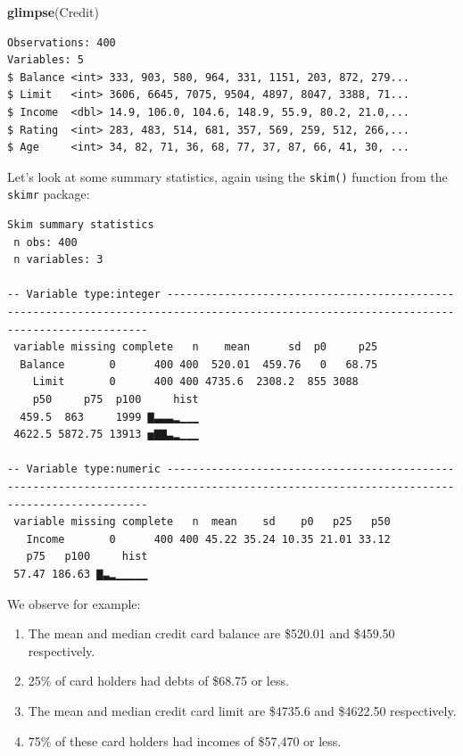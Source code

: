 \documentclass[12pt,]{krantz}
\makeatletter
\newenvironment{Shaded}{\begin{snugshade}}{\end{snugshade}}
\newcommand{\KeywordTok}[1]{\textcolor[rgb]{0.27,0.27,0.27}{\textbf{#1}}}
\newcommand{\StringTok}[1]{\textcolor[rgb]{0.5,0.5,0.5}{#1}}
\newcommand{\OperatorTok}[1]{\textcolor[rgb]{0.43,0.43,0.43}{\textbf{#1}}}
\newcommand{\NormalTok}[1]{#1}
\providecommand{\tightlist}{%
  \setlength{\itemsep}{0pt}\setlength{\parskip}{0pt}}
\newenvironment{kframe}{%
\medskip{}
\setlength{\fboxsep}{.8em}
 \def\at@end@of@kframe{}%
 \ifinner\ifhmode%
  \def\at@end@of@kframe{\end{minipage}}%
  \begin{minipage}{\columnwidth}%
 \fi\fi%
 \def\FrameCommand##1{\hskip\@totalleftmargin \hskip-\fboxsep
 \colorbox{shadecolor}{##1}\hskip-\fboxsep
     \hskip-\linewidth \hskip-\@totalleftmargin \hskip\columnwidth}%
 \MakeFramed {\advance\hsize-\width
   \@totalleftmargin\z@ \linewidth\hsize
   \@setminipage}}%
 {\par\unskip\endMakeFramed%
 \at@end@of@kframe}
\renewenvironment{Shaded}{\begin{kframe}}{\end{kframe}}
\theoremstyle{definition}
\theoremstyle{definition}
\theoremstyle{definition}
\theoremstyle{remark}
\makeatother
\begin{document}
\begin{Shaded}
\begin{Highlighting}[]
\KeywordTok{glimpse}\NormalTok{(Credit)}
\end{Highlighting}
\end{Shaded}

\begin{verbatim}
Observations: 400
Variables: 5
$ Balance <int> 333, 903, 580, 964, 331, 1151, 203, 872, 279...
$ Limit   <int> 3606, 6645, 7075, 9504, 4897, 8047, 3388, 71...
$ Income  <dbl> 14.9, 106.0, 104.6, 148.9, 55.9, 80.2, 21.0,...
$ Rating  <int> 283, 483, 514, 681, 357, 569, 259, 512, 266,...
$ Age     <int> 34, 82, 71, 36, 68, 77, 37, 87, 66, 41, 30, ...
\end{verbatim}

Let's look at some summary statistics, again using the \texttt{skim()}
function from the \texttt{skimr} package:

\begin{Shaded}
\end{Shaded}

\begin{verbatim}
Skim summary statistics
 n obs: 400 
 n variables: 3 

-- Variable type:integer -----------------------------------------------------------------------------------------------------------------------------------------
 variable missing complete   n    mean      sd  p0     p25
  Balance       0      400 400  520.01  459.76   0   68.75
    Limit       0      400 400 4735.6  2308.2  855 3088   
    p50     p75  p100     hist
  459.5  863     1999 ▇▃▃▃▂▁▁▁
 4622.5 5872.75 13913 ▅▇▇▃▂▁▁▁

-- Variable type:numeric -----------------------------------------------------------------------------------------------------------------------------------------
 variable missing complete   n  mean    sd    p0   p25   p50
   Income       0      400 400 45.22 35.24 10.35 21.01 33.12
   p75   p100     hist
 57.47 186.63 ▇▃▂▁▁▁▁▁
\end{verbatim}

We observe for example:

\begin{enumerate}
\def\labelenumi{\arabic{enumi}.}
\tightlist
\item
  The mean and median credit card balance are \$520.01 and \$459.50
  respectively.
\item
  25\% of card holders had debts of \$68.75 or less.
\item
  The mean and median credit card limit are \$4735.6 and \$4622.50
  respectively.
\item
  75\% of these card holders had incomes of \$57,470 or less.
\end{enumerate}
\end{document}
